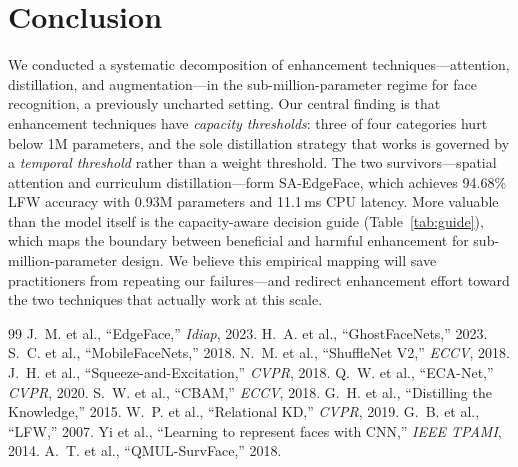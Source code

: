 \documentclass[journal,10pt]{IEEEtran}
\begin{document}
\section{Conclusion}
\label{sec:conclusion}

We conducted a systematic decomposition of enhancement techniques---attention, distillation, and augmentation---in the sub-million-parameter regime for face recognition, a previously uncharted setting. Our central finding is that enhancement techniques have \emph{capacity thresholds}: three of four categories hurt below 1M parameters, and the sole distillation strategy that works is governed by a \emph{temporal threshold} rather than a weight threshold. The two survivors---spatial attention and curriculum distillation---form SA-EdgeFace, which achieves 94.68\% LFW accuracy with 0.93M parameters and 11.1\,ms CPU latency. More valuable than the model itself is the capacity-aware decision guide (Table~\ref{tab:guide}), which maps the boundary between beneficial and harmful enhancement for sub-million-parameter design. We believe this empirical mapping will save practitioners from repeating our failures---and redirect enhancement effort toward the two techniques that actually work at this scale.


\begin{thebibliography}{99}
 J.~M. et al., ``EdgeFace,'' \emph{Idiap}, 2023.
 H.~A. et al., ``GhostFaceNets,'' 2023.
 S.~C. et al., ``MobileFaceNets,'' 2018.
 N.~M. et al., ``ShuffleNet V2,'' \emph{ECCV}, 2018.
 J.~H. et al., ``Squeeze-and-Excitation,'' \emph{CVPR}, 2018.
 Q.~W. et al., ``ECA-Net,'' \emph{CVPR}, 2020.
 S.~W. et al., ``CBAM,'' \emph{ECCV}, 2018.
 G.~H. et al., ``Distilling the Knowledge,'' 2015.
 W.~P. et al., ``Relational KD,'' \emph{CVPR}, 2019.
 G.~B. et al., ``LFW,'' 2007.
 Yi et al., ``Learning to represent faces with CNN,'' \emph{IEEE TPAMI}, 2014.
 A.~T. et al., ``QMUL-SurvFace,'' 2018.
\end{thebibliography}
\end{document}
